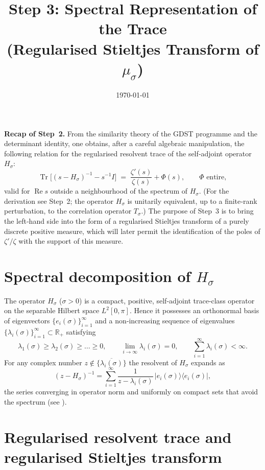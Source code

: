 \documentclass[11pt,a4paper]{article}
\title{\bf Step 3: Spectral Representation of the Trace\\
(Regularised Stieltjes Transform of \(\mu_\sigma\))}
\author{}
\date{\today}
\newcommand{\R}{\mathbb{R}}
\newcommand{\Tr}{\operatorname{Tr}}
\newcommand{\RE}{\operatorname{Re}}
\begin{document}
\maketitle

\noindent
\textbf{Recap of Step~2.}  From the similarity theory of the GDST programme and the determinant identity, one obtains, after a careful algebraic manipulation, the following relation for the regularised resolvent trace of the self‑adjoint operator \(H_\sigma\):
\begin{equation}\label{eq:step2}
\Tr\!\Big[ (s - H_\sigma)^{-1} - s^{-1}I \Big] \;=\; \frac{\zeta'(s)}{\zeta(s)} + \Phi(s),
\qquad \Phi \text{ entire},
\end{equation}
valid for \(\RE s\) outside a neighbourhood of the spectrum of \(H_\sigma\).
(For the derivation see Step~2; the operator \(H_\sigma\) is unitarily equivalent, up to a finite‑rank perturbation, to the correlation operator \(T_\sigma\).)
The purpose of Step~3 is to bring the left‑hand side into the form of a regularised Stieltjes transform of a purely discrete positive measure, which will later permit the identification of the poles of \(\zeta'/\zeta\) with the support of this measure.

\section{Spectral decomposition of \(H_\sigma\)}

The operator \(H_\sigma\) (\(\sigma > 0\)) is a compact, positive, self‑adjoint trace‑class operator on the separable Hilbert space \(L^2[0,\pi]\).  Hence it possesses an orthonormal basis of eigenvectors \(\{e_i(\sigma)\}_{i=1}^\infty\) and a non‑increasing sequence of eigenvalues \(\{\lambda_i(\sigma)\}_{i=1}^\infty \subset \R_+\) satisfying
\[
\lambda_1(\sigma) \ge \lambda_2(\sigma) \ge \dots \ge 0, \qquad 
\lim_{i\to\infty} \lambda_i(\sigma) = 0, \qquad 
\sum_{i=1}^\infty \lambda_i(\sigma) < \infty .
\]
For any complex number \(z \notin \overline{\{\lambda_i(\sigma)\}}\) the resolvent of \(H_\sigma\) expands as
\[
(z - H_\sigma)^{-1} = \sum_{i=1}^\infty \frac{1}{z - \lambda_i(\sigma)} \, |e_i(\sigma)\rangle\langle e_i(\sigma)|,
\]
the series converging in operator norm and uniformly on compact sets that avoid the spectrum (see \cite{Simon}).

\section{Regularised resolvent trace and regularised Stieltjes transform}
\end{document}
